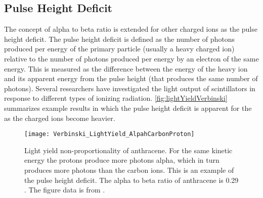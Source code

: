 \subsection{Pulse Height Deficit}
\label{sec:PulseHeightDeficit}
The concept of alpha to beta ratio is extended for other charged ions as the pulse height deficit.
The pulse height deficit is defined as the number of photons produced per energy of the primary particle (usually a heavy charged ion) relative to the number of photons produced per energy by an electron of the same energy.
This is measured as the difference between the energy of the heavy ion and its apparent energy from the pulse height (that produces the same number of photons).  
Several researchers have investigated the light output of scintillators in response to different types of ionizing radiation\cite{Verbinski_1968}.
\autoref{fig:lightYieldVerbinski} summarizes example results in which the pulse height deficit is apparent for the as the charged ions become heavier.
\begin{figure}
  \centering
  \texttt{[image: Verbinski\_LightYield\_AlpahCarbonProton]}
  \caption[Light yield non-proportionality of anthracene]{Light yield non-proportionality of anthracene. For the same kinetic energy the protons produce more photons alpha, which in turn produces more photons than the  carbon ions. This is an example of the pulse height deficit. The alpha to beta ratio of anthracene is \num{0.29} \cite{5075983}. The figure data is from \cite{Verbinski_1968}.}
  \label{fig:lightYieldVerbinski}
\end{figure}

